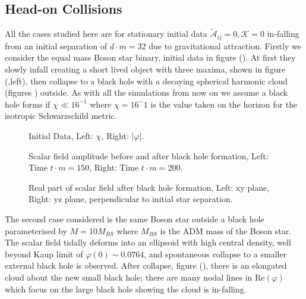 \documentclass[11pt, oneside]{report}  %
\newcommand{\K}{\mathcal{K}}
\newcommand{\vp}{\varphi}
\newcommand{\A}{\mathcal{A}}
\numberwithin{equation}{section}
\begin{document}
\subsection{Head-on Collisions}
All the cases studied here are for stationary initial data $\tilde{\A}_{ij}=0,\K=0$ in-falling from an initial separation of $d \cdot m = 32$ due to gravitational attraction. Firstly we consider the equal mass Boson star binary, initial data in figure (). At first they slowly infall creating a short lived object with three maxima, shown in figure (,left), then collapse to a black hole with a decaying spherical harmonic cloud (figures ) outside. As with all the simulations from now on we assume a black hole forms if $\chi \ll 16^{-1}$ where $\chi=16^-1$ is the value taken on the horizon for the isotropic Schwarzschild metric.
  \begin{figure}[H]
  \caption{Initial Data, Left: $\chi$, Right: $|\vp|$.}
  \centering
  \hfill
\end{figure}
  \begin{figure}[H]
  \caption{Scalar field amplitude before and after black hole formation, Left: Time $t\cdot m = 150$, Right: Time $t \cdot m = 200$.}
  \centering
  \hfill
\end{figure}
   \begin{figure}[H]
  \caption{Real part of scalar field after black hole formation, Left: xy plane, Right: yz plane, perpendicular to initial star separation.}
  \centering
  \hfill
\end{figure}
 
The second case considered is the same Boson star outside a black hole parameterised by $M=10M_{BS}$ where $M_{BS}$ is the ADM mass of the Boson star. The scalar field tidally deforms into an ellipsoid with high central density, well beyond Kaup limit of $\vp(0)\sim 0.0764$, and spontaneous collapse to a smaller external black hole is observed. After collapse, figure (), there is an elongated cloud about the new small black hole; there are many nodal lines in $\mathrm{Re}(\vp)$ which focus on the large black hole showing the cloud is in-falling.
\end{document}
